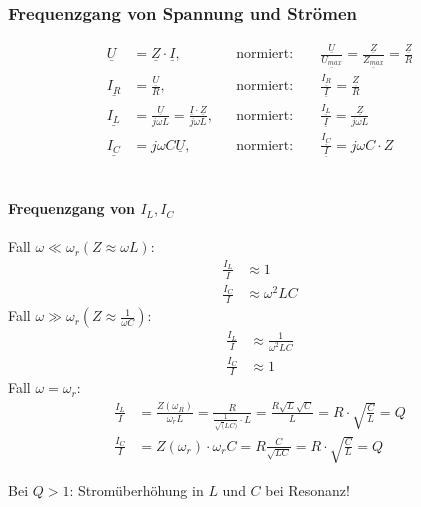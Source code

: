 \subsubsection{Frequenzgang von Spannung und Strömen}
\begin{align}
	\underline{U} &= \underline{Z} \cdot \underline{I},
	&& \text{normiert: }
	&& \frac{\underline{U}}{\underline{U_{max}}} =
	\frac{\underline{Z}}{\underline{Z_{max}}} = \frac{\underline{Z}}{R}\nonumber\\
	\underline{I_R} &= \frac{\underline{U}}{R},
	&& \text{normiert:}
	&& \frac{\underline{I_R}}{\underline{I}} = \frac{\underline{Z}}{R}\nonumber\\
	\underline{I_L} &= \frac{\underline{U}}{j\omega L} =
	\frac{\underline{I}\cdot\underline{Z}}{j\omega L},
	&& \text{normiert:	}
	&& \frac{\underline{I_L}}{\underline{I}}=\frac{\underline{Z}}{j\omega
	L}\nonumber\\
	\underline{I_C} &= j\omega C \underline{U},
	&& \text{normiert:}
	&& \frac{\underline{I_C}}{\underline{I}} = j\omega C\cdot Z\nonumber
\end{align}\\

\paragraph{Frequenzgang von $I_L, I_C$}
Fall $\omega \ll \omega_r (Z \approx \omega L)$:
\begin{align}
	\frac{I_L}{I} &\approx 1\nonumber\\
	\frac{I_C}{I} &\approx \omega^2LC\nonumber
\end{align}
Fall $\omega \gg \omega_r (Z \approx \frac{1}{\omega C})$:
\begin{align}
	\frac{I_L}{I} &\approx \frac{1}{\omega^2LC}\nonumber\\
	\frac{I_C}{I} &\approx 1\nonumber
\end{align}
Fall $\omega = \omega_r$:
\begin{align}
	\frac{I_L}{I} &= \frac{Z(\omega_R)}{\omega_r L} =
	\frac{R}{\frac{1}{\sqrt(LC)}\cdot L} = \frac{R\sqrt{L}\sqrt{C}}{L} =
	R\cdot\sqrt{\frac{C}{L}} = Q\nonumber\\
	\frac{I_C}{I} &= Z(\omega_r)\cdot \omega_r C = R \frac{C}{\sqrt{LC}} = R\cdot
	\sqrt{\frac{C}{L}} = Q\nonumber
\end{align}

Bei $Q>1$: Stromüberhöhung in $L$ und $C$ bei Resonanz!

